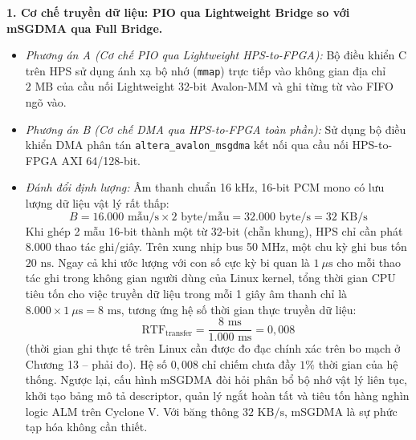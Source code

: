 \textbf{1. Cơ chế truyền dữ liệu: PIO qua Lightweight Bridge so với mSGDMA qua Full Bridge.}
\begin{itemize}[leftmargin=1.5em, itemsep=2pt]
    \item \emph{Phương án A (Cơ chế PIO qua Lightweight HPS-to-FPGA):} Bộ điều khiển C trên HPS sử dụng ánh xạ bộ nhớ (\texttt{mmap}) trực tiếp vào không gian địa chỉ $2\text{ MB}$ của cầu nối Lightweight 32-bit Avalon-MM và ghi từng từ vào FIFO ngõ vào.
    \item \emph{Phương án B (Cơ chế DMA qua HPS-to-FPGA toàn phần):} Sử dụng bộ điều khiển DMA phân tán \texttt{altera\_}\linebreak[0]\texttt{avalon\_}\linebreak[0]\texttt{msgdma} kết nối qua cầu nối HPS-to-FPGA AXI 64/128-bit.
    \item \emph{Đánh đổi định lượng:} Âm thanh chuẩn 16 kHz, 16-bit PCM mono có lưu lượng dữ liệu vật lý rất thấp:
    \begin{equation}
    B = 16.000\text{ mẫu/s} \times 2\text{ byte/mẫu} = 32.000\text{ byte/s} = 32\text{ KB/s}
    \end{equation}
    Khi ghép 2 mẫu 16-bit thành một từ 32-bit (chẵn khung), HPS chỉ cần phát $8.000$ thao tác ghi/giây. Trên xung nhịp bus 50 MHz, một chu kỳ ghi bus tốn $20\text{ ns}$. Ngay cả khi ước lượng với con số cực kỳ bi quan là $1\ \mu\text{s}$ cho mỗi thao tác ghi trong không gian người dùng của Linux kernel, tổng thời gian CPU tiêu tốn cho việc truyền dữ liệu trong mỗi 1 giây âm thanh chỉ là $8.000 \times 1\ \mu\text{s} = 8\text{ ms}$, tương ứng hệ số thời gian thực truyền dữ liệu:
    \begin{equation}
    \text{RTF}_{\text{transfer}} = \frac{8\text{ ms}}{1.000\text{ ms}} = 0{,}008
    \end{equation}
    (thời gian ghi thực tế trên Linux cần được đo đạc chính xác trên bo mạch ở Chương 13 -- phải đo). Hệ số $0{,}008$ chỉ chiếm chưa đầy $1\%$ thời gian của hệ thống. Ngược lại, cấu hình mSGDMA đòi hỏi phân bổ bộ nhớ vật lý liên tục, khởi tạo bảng mô tả descriptor, quản lý ngắt hoàn tất và tiêu tốn hàng nghìn logic ALM trên Cyclone V. Với băng thông $32\text{ KB/s}$, mSGDMA là sự phức tạp hóa không cần thiết.
\end{itemize}

